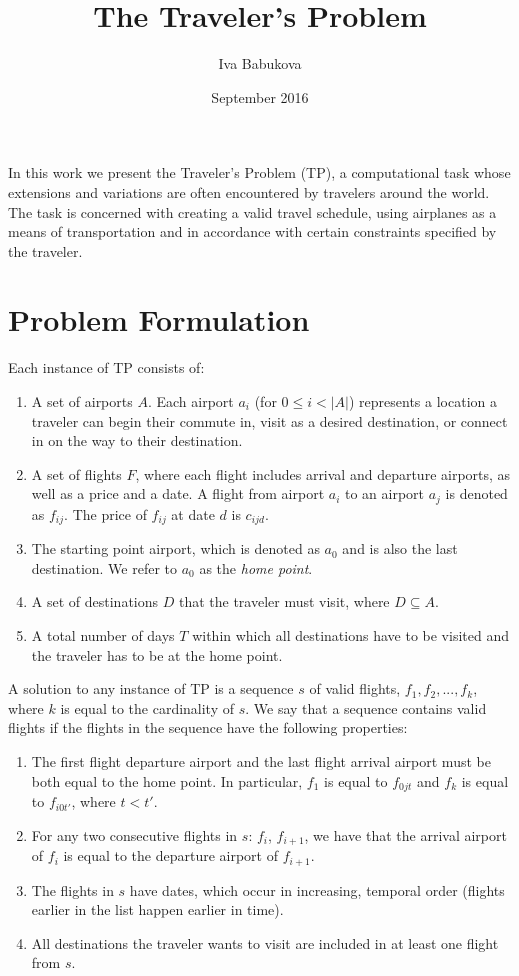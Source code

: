 \documentclass{article}
\title{The Traveler's Problem}
\author{Iva Babukova}
\date{September 2016}
\theoremstyle{definition}
\begin{document}
\maketitle

In this work we present the Traveler's Problem (TP), a computational task whose extensions and variations are often encountered by travelers around the world. The task is concerned with creating a valid travel schedule, using airplanes as a means of transportation and in accordance with certain constraints specified by the traveler.

\section{Problem Formulation}
Each instance of TP consists of:

\begin{enumerate}
\item A set of airports $A$. Each airport $a_{i}$ (for $0\leq i<|A|$) represents a location a traveler can begin their commute in, visit as a desired destination, or connect in on the way to their destination.
\item A set of flights $F$, where each flight includes arrival and departure airports, as well as a price and a date. A flight from airport $a_{i}$ to an airport $a_{j}$ is denoted as $f_{ij}$. The price of $f_{ij}$ at date $d$ is $c_{ijd}$.
\item The starting point airport, which is denoted as $a_{0}$ and is also the last destination. We refer to $a_{0}$ as the \textit{home point}.
\item A set of destinations $D$ that the traveler must visit, where $D \subseteq A$.
\item A total number of days $T$ within which all destinations have to be visited and the traveler has to be at the home point.
\end{enumerate}

A solution to any instance of TP is a sequence $s$ of valid flights, ${f_{1}, f_{2}, ..., f_{k}}$, where $k$ is equal to the cardinality of $s$. We say that a sequence contains valid flights if the flights in the sequence have the following properties:

\begin{enumerate}
\item The first flight departure airport and the last flight arrival airport must be both equal to the home point. In particular, $f_{1}$ is equal to $f_{0jt}$ and $f_{k}$ is equal to $f_{i0t\prime}$, where $t < t\prime$.
\item For any two consecutive flights in $s$: $f_{i}$, $f_{i+1}$, we have that the arrival airport of $f_{i}$ is equal to the departure airport of $f_{i+1}$. 
\item The flights in $s$ have dates, which occur in increasing, temporal order (flights earlier in the list happen earlier in time).
\item All destinations the traveler wants to visit are included in at least one flight from $s$.
\end{enumerate}
\end{document}
